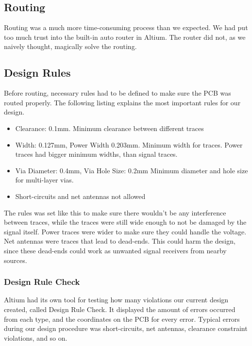 \begin{itemize}
\section{Routing}
Routing was a much more time-consuming process than we expected. We had put too much trust into the built-in auto router in Altium. The router did not, as we naively thought, magically solve the routing. 
\subsection{Design Rules}
Before routing, necessary rules had to be defined to make sure the PCB was routed properly. The following listing explains the most important rules for our design.
\begin{itemize}
\item Clearance: 0.1mm. 
\newline
Minimum clearance between different traces
\item Width: 0.127mm, Power Width 0.203mm.
\newline
Minimum width for traces. Power traces had bigger minimum widths, than signal traces.
\item Via Diameter: 0.4mm, Via Hole Size: 0.2mm
\newline
Minimum diameter and hole size for multi-layer vias.
\item Short-circuits and net antennas not allowed
\end{itemize}
The rules was set like this to make sure there wouldn't be any interference between traces, while the traces were still wide enough to not be damaged by the signal itself. Power traces were wider to make sure they could handle the voltage. 
\newline
Net antennas were traces that lead to dead-ends. This could harm the design, since these dead-ends could work as unwanted signal receivers from nearby sources.
\newline
\subsubsection{Design Rule Check}
Altium had its own tool for testing how many violations our current design created, called Design Rule Check. It displayed the amount of errors occurred from each type, and the coordinates on the PCB for every error. 
Typical errors during our design procedure was short-circuits, net antennas, clearance constraint violations, and so on.

\end{itemize}
